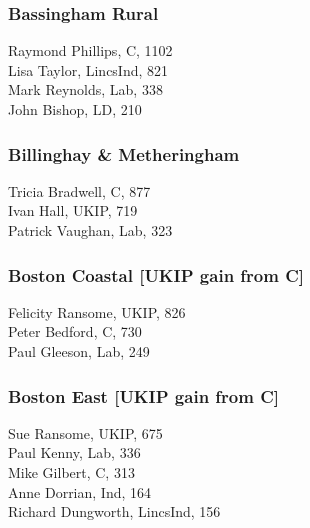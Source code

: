 \documentclass[a4paper,openany,10pt]{book}
\begin{document}
\subsubsection*{Bassingham Rural}



Raymond Phillips, C, 1102\\
Lisa Taylor, LincsInd, 821\\
Mark Reynolds, Lab, 338\\
John Bishop, LD, 210\\


\subsubsection*{Billinghay \& Metheringham}



Tricia Bradwell, C, 877\\
Ivan Hall, UKIP, 719\\
Patrick Vaughan, Lab, 323\\


\subsubsection*{Boston Coastal \hspace*{\fill}\nolinebreak[1]%
\enspace\hspace*{\fill}
[UKIP gain from C]}



Felicity Ransome, UKIP, 826\\
Peter Bedford, C, 730\\
Paul Gleeson, Lab, 249\\


\subsubsection*{Boston East \hspace*{\fill}\nolinebreak[1]%
\enspace\hspace*{\fill}
[UKIP gain from C]}



Sue Ransome, UKIP, 675\\
Paul Kenny, Lab, 336\\
Mike Gilbert, C, 313\\
Anne Dorrian, Ind, 164\\
Richard Dungworth, LincsInd, 156\\
\end{document}
